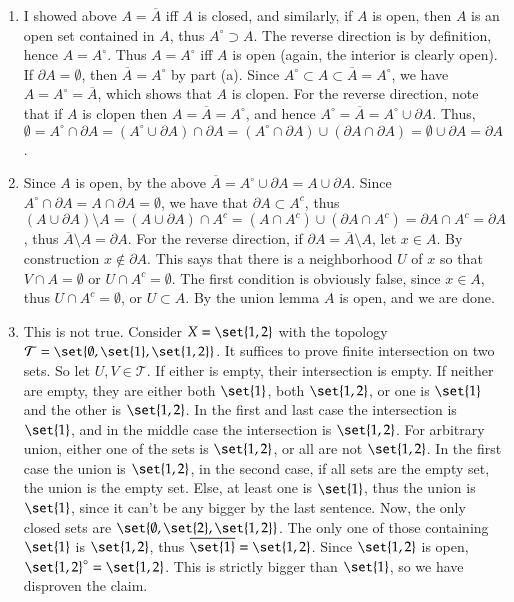 \documentclass[12pt]{article}
\theoremstyle{definitionstyle}
\begin{document}
\begin{enumerate}[leftmargin=\labelsep]
\begin{enumerate}
			\item I showed above $A = \overline{A}$ iff $A$ is closed, and similarly, if $A$ is open, then $A$ is an open set contained in $A$, thus $A^{\circ} \supset A$. The reverse direction is by definition, hence $A = A^{\circ}$. Thus $A = A^{\circ}$ iff $A$ is open (again, the interior is clearly open). If $\partial A = \emptyset$, then $\overline{A} = A^{\circ}$ by part (a). Since $A^{\circ} \subset A \subset \overline{A} = A^{\circ}$, we have $A = A^{\circ} = \overline{A}$, which shows that $A$ is clopen. For the reverse direction, note that if $A$ is clopen then $A = \overline{A} = A^{\circ}$, and hence $A^{\circ} = \overline{A} = A^{\circ} \cup \partial A$. Thus, $\emptyset = A^\circ \cap \partial A = (A^{\circ} \cup \partial A) \cap \partial A = (A^\circ \cap \partial A) \cup (\partial A \cap \partial A) = \emptyset \cup \partial A = \partial A$.
			
			\item Since $A$ is open, by the above $\overline{A} = A^\circ \cup \partial A = A \cup \partial A$. Since $A^\circ \cap \partial A = A \cap \partial A = \emptyset$, we have that $\partial A \subset A^c$, thus $(A \cup \partial A) \setminus A = (A \cup \partial A) \cap A^c = (A \cap A^c) \cup (\partial A \cap A^c) = \partial A \cap A^c = \partial A$, thus $\overline{A} \setminus A = \partial A$. For the reverse direction, if $\partial A = \overline{A} \setminus A$, let $x \in A$. By construction $x \not \in \partial A$. This says that there is a neighborhood $U$ of $x$ so that $V \cap A = \emptyset$ or $U \cap A^c = \emptyset$. The first condition is obviously false, since $x \in A$, thus $U \cap A^c = \emptyset$, or $U \subset A$. By the union lemma $A$ is open, and we are done.
			
			\item This is not true. Consider $X = \set{1, 2}$ with the topology $\mathcal{T} = \set{\emptyset, \set{1}, \set{1, 2}}$. It suffices to prove finite intersection on two sets. So let $U, V \in \mathcal{T}$. If either is empty, their intersection is empty. If neither are empty, they are either both $\set{1}$, both $\set{1, 2}$, or one is $\set{1}$ and the other is $\set{1, 2}$. In the first and last case the intersection is $\set{1}$, and in the middle case the intersection is $\set{1, 2}$. For arbitrary union, either one of the sets is $\set{1, 2}$, or all are not $\set{1, 2}$. In the first case the union is $\set{1, 2}$, in the second case, if all sets are the empty set, the union is the empty set. Else, at least one is $\set{1}$, thus the union is $\set{1}$, since it can't be any bigger by the last sentence. Now, the only closed sets are $\set{\emptyset, \set{2}, \set{1, 2}}$. The only one of those containing $\set{1}$ is $\set{1, 2}$, thus $\overline{\set{1}} = \set{1, 2}$. Since $\set{1, 2}$ is open, $\set{1, 2}^\circ = \set{1, 2}$. This is strictly bigger than $\set{1}$, so we have disproven the claim.
		\end{enumerate}
	

\end{enumerate}
\end{document}
